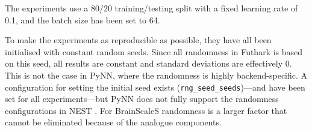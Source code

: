 \documentclass[report.tex]{subfiles}
\begin{document}
The experiments use a 80/20 training/testing split with a fixed learning rate of
0.1, and the batch size has been set to 64.

To make the experiments as reproducible as possible, they have all been
initialised with constant random seeds.
Since all randomness in Futhark is based on this seed, all results are constant and
standard deviations are effectively 0.
This is not the case in PyNN, where the randomness is highly backend-specific.
A configuration for setting the initial seed exists
(\texttt{rng\_seed\_seeds})---and have been set for all experiments---but
PyNN does not fully support the randomness configurations in NEST
\cite{Gewaltig2007}.
For BrainScaleS randomness is a larger factor that cannot be eliminated because of the analogue
components.
\end{document}
